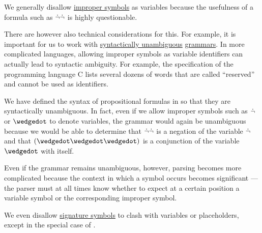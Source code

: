 \begin{remark}\label{rem:improper_symbols_and_parsing}
  We generally disallow \hyperref[con:improper_symbol]{improper symbols} as variables because the usefulness of a formula such as \( \dot{\neg} \dot{\neg} \) is highly questionable.

  There are however also technical considerations for this. For example, it is important for us to work with \hyperref[def:grammar_ambiguity]{syntactically unambiguous} \hyperref[def:formal_grammar]{grammars}. In more complicated languages, allowing improper symbols as variable identifiers can actually lead to syntactic ambiguity. For example, the specification \cite[\S 6.4.1]{ISO:9899:2018} of the programming language C lists several dozens of words that are called \enquote{reserved} and cannot be used as identifiers.

  We have defined the syntax of propositional formulas in  so that they are syntactically unambiguous. In fact, even if we allow improper symbols such as \( \dot{\neg} \) or \( {\synwedge} \) to denote variables, the grammar would again be unambiguous because we would be able to determine that \( \dot{\neg} \dot{\neg} \) is a negation of the variable \( \dot{\neg} \) and that \( (\synwedge \synwedge \synwedge) \) is a conjunction of the variable \( {\synwedge} \) with itself.

  Even if the grammar remains unambiguous, however, parsing becomes more complicated because the context in which a symbol occurs becomes significant --- the parser must at all times know whether to expect at a certain position a variable symbol or the corresponding improper symbol.

  We even disallow \hyperref[con:logical_system_signature]{signature symbols} to clash with variables or placeholders, except in the special case of .
\end{remark}

